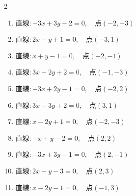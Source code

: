 \begin{multicols}{2}
\begin{enumerate}

  \item $直線:-3x+3y-2=0,\quad 点 ( -2, -3 )$


\columnbreak %

\resetques

  \item $直線:2x+y+1=0,\quad 点 ( -3, 1 )$


  \item $直線:x+y-1=0,\quad 点 ( -2, -1 )$


  \item $直線:3x-2y+2=0,\quad 点 ( -1, -3 )$


  \item $直線:-3x+2y-1=0,\quad 点 ( -2, 2 )$


  \item $直線:3x-3y+2=0,\quad 点 ( 3, 1 )$


  \item $直線:x-2y+1=0,\quad 点 ( -2, -3 )$


  \item $直線:-x+y-2=0,\quad 点 ( 2, 2 )$


  \item $直線:-3x+3y-1=0,\quad 点 ( 2, -1 )$


  \item $直線:2x-y-3=0,\quad 点 ( 2, 3 )$


  \item $直線:x-2y-1=0,\quad 点 ( -1, 3 )$



\end{enumerate}
\end{multicols}
